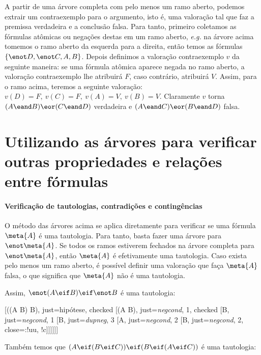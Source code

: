 A partir de uma árvore completa com pelo menos um ramo aberto, podemos extrair um contraexemplo para o argumento, isto é, uma valoração tal que faz a premissa verdadeira e a conclusão falsa. Para tanto, primeiro coletamos as fórmulas atômicas ou negações destas em um ramo aberto, \emph{e.g.} na árvore acima tomemos o ramo aberto da esquerda para a direita, então temos as fórmulas $\{\enot D, \enot C, A, B\}$.
Depois definimos a valoração contraexemplo $v$ da seguinte maneira: se uma fórmula atômica aparece negada no ramo aberto, a valoração contraexemplo lhe atribuirá $F$, caso contrário, atribuirá $V$.
Assim, para o ramo acima, teremos a seguinte valoração: $v(D)=F,\: v(C)=F,\: v(A)=V,\: v(B)=V$.
Claramente $v$ torna $(A \eand B) \eor (C \eand D)$ verdadeira e $(A \eand C) \eor (B \eand D)$ falsa.

\section{Utilizando as árvores para verificar outras propriedades e relações entre fórmulas}

\paragraph{Verificação de tautologias, contradições e contingências}

O método das árvores acima se aplica diretamente para verificar se uma fórmula $\meta{A}$ é uma tautologia.
Para tanto, basta fazer uma árvore para $\enot\meta{A}$.
Se todos os ramos estiverem fechados na árvore completa para $\enot\meta{A}$, então $\meta{A}$ é efetivamente uma tautologia.
Caso exista pelo menos um ramo aberto, é possível definir uma valoração que faça $\meta{A}$ falsa, o que significa que $\meta{A}$ não é uma tautologia.

Assim, $\enot(A \eif B) \eif \enot B$ é uma tautologia:

\begin{center}
\begin{tableau}
	{
	}
	[\enot(\enot(A \eif B) \eif \enot B), just={hipótese}, checked
		[\enot(A \eif B), just={\emph{negcond}, 1}, checked
		[\enot \enot B, just={\emph{negcond}, 1}
		[B, just={\emph{dupneg}, 3}
		[A, just={\emph{negcond}, 2}
		[\enot B, just={\emph{negcond}, 2}, close={:!uu, !c}]]]]]]
\end{tableau}
\end{center}

Também temos que $(A \eif (B \eif C)) \eif (B \eif (A \eif C))$ é uma tautologia:

